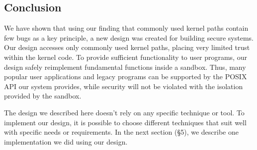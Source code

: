 \subsection{Conclusion}
We have shown that using our finding that commonly used kernel paths contain few bugs as a key principle, a new design was created 
for building secure systems. Our design accesses only commonly used kernel paths, placing very limited trust within the kernel code. 
To provide sufficient functionality to user programs, our design safely reimplement fundamental functions inside a sandbox. Thus, many 
popular user applications and legacy programs can be supported by the POSIX API our system provides, while security will not be violated 
with the isolation provided by the sandbox. 

The design we described here doesn't rely on any specific technique or tool. To implement our design, it is possible to choose different techniques 
that suit well with specific needs or requirements. In the next section (\S{5}), we describe one implementation we did using our design. 